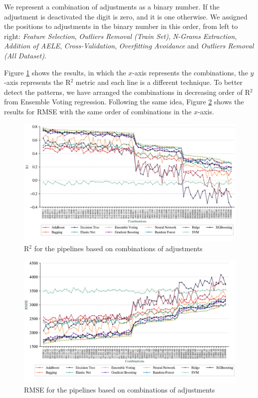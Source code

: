 We represent a combination of adjustments as a binary number. If the adjustment is deactivated the digit is zero, and it is one otherwise. We assigned the positions to adjustments in the binary number in this order, from left to right: \textit{Feature Selection}, \textit{Outliers Removal (Train Set)}, \textit{N-Grams Extraction}, \textit{Addition of \gls{AELE}}, \textit{Cross-Validation}, \textit{Overfitting Avoidance} and \textit{Outliers Removal (All Dataset)}.

Figure \ref{fig:combinations_r2} shows the results, in which the $x$-axis represents the combinations, the $y$-axis represents the R$^2$ metric and each line is a different technique. To better detect the patterns, we have arranged the combinations in decreasing order of R$^2$ from Ensemble Voting regression. Following the same idea, Figure \ref{fig:combinations_rmse} shows the results for \gls{RMSE} with the same order of combinations in the $x$-axis.



\begin{figure}[htb]
  \centering
  \caption{R$^2$ for the pipelines based on combinations of adjustments}
  \label{fig:combinations_r2}
  \includegraphics[width=\textwidth]{images/chapters/combinations_r2.pdf}
\end{figure}



\begin{figure}[htb]
  \centering
  \caption{RMSE for the pipelines based on combinations of adjustments}
  \label{fig:combinations_rmse}
  \includegraphics[width=\textwidth]{images/chapters/combinations_rmse.pdf}
\end{figure}


